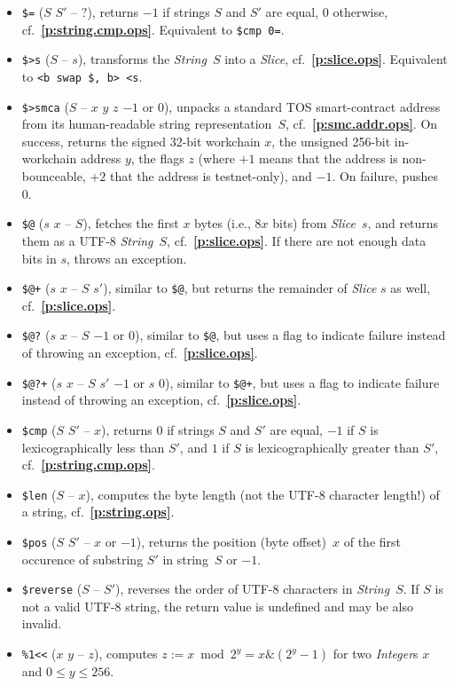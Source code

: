 \documentclass[12pt,oneside]{article}
\def\refpoint#1{{\rm\textbf{\ref{#1}}}}
\let\ptref=\refpoint
\begin{document}
\begin{itemize}
\item {\tt \$=} ($S$ $S'$ -- $?$), returns $-1$ if strings $S$ and $S'$ are equal, $0$ otherwise, cf.~\ptref{p:string.cmp.ops}. Equivalent to {\tt \$cmp 0=}.
\item {\tt \$>s} ($S$ -- $s$), transforms the {\em String\/}~$S$ into a {\em Slice}, cf.~\ptref{p:slice.ops}. Equivalent to {\tt <b swap \$, b> <s}.
\item {\tt \$>smca} ($S$ -- $x$ $y$ $z$ $-1$ or $0$), unpacks a standard TOS smart-contract address from its human-readable string representation~$S$, cf.~\ptref{p:smc.addr.ops}. On success, returns the signed 32-bit workchain $x$, the unsigned 256-bit in-workchain address $y$, the flags $z$ (where $+1$ means that the address is non-bounceable, $+2$ that the address is testnet-only), and $-1$. On failure, pushes $0$.
\item {\tt \$@} ($s$ $x$ -- $S$), fetches the first $x$ bytes (i.e., $8x$ bits) from {\em Slice}~$s$, and returns them as a UTF-8 {\em String\/}~$S$, cf.~\ptref{p:slice.ops}. If there are not enough data bits in $s$, throws an exception.
\item {\tt \$@+} ($s$ $x$ -- $S$ $s'$), similar to {\tt \$@}, but returns the remainder of {\em Slice\/} $s$ as well, cf.~\ptref{p:slice.ops}.
\item {\tt \$@?} ($s$ $x$ -- $S$ $-1$ or $0$), similar to {\tt \$@}, but uses a flag to indicate failure instead of throwing an exception, cf.~\ptref{p:slice.ops}.
\item {\tt \$@?+} ($s$ $x$ -- $S$ $s'$ $-1$ or $s$ $0$), similar to {\tt \$@+}, but uses a flag to indicate failure instead of throwing an exception, cf.~\ptref{p:slice.ops}.
\item {\tt \$cmp} ($S$ $S'$ -- $x$), returns $0$ if strings $S$ and $S'$ are equal, $-1$ if $S$ is lexicographically less than $S'$, and $1$ if $S$ is lexicographically greater than $S'$, cf.~\ptref{p:string.cmp.ops}.
\item {\tt \$len} ($S$ -- $x$), computes the byte length (not the UTF-8 character length!) of a string, cf.~\ptref{p:string.ops}.
\item {\tt \$pos} ($S$ $S'$ -- $x$ or $-1$), returns the position (byte offset)~$x$ of the first occurence of substring $S'$ in string~$S$ or $-1$.
\item {\tt \$reverse} ($S$ -- $S'$), reverses the order of UTF-8 characters in {\em String\/}~$S$. If $S$ is not a valid UTF-8 string, the return value is undefined and may be also invalid.
\item {\tt \%1<{<}} ($x$ $y$ -- $z$), computes $z:=x\bmod 2^y=x\&(2^y-1)$ for two {\em Integer\/}s $x$ and $0\leq y\leq 256$.

\end{itemize}
\end{document}

